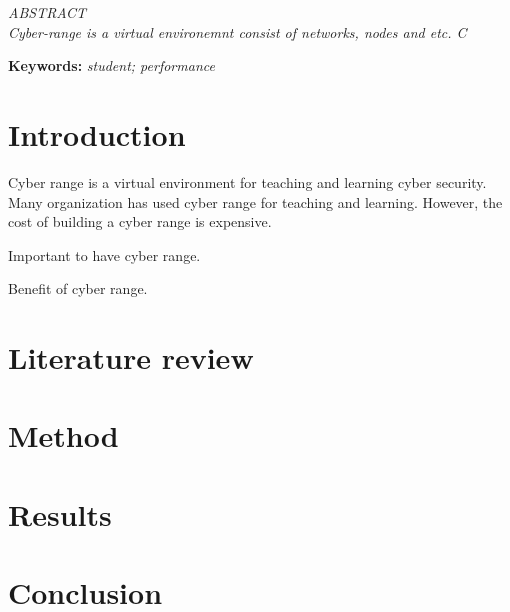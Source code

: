 \documentclass[onecolumn]{article}
\date{}
\makeatletter
\renewenvironment{abstract}
{\trivlist\item[]\leftskip1pt\par\itshape{\centering\itshape ABSTRACT\\\noindent }\ignorespaces}{\endtrivlist\vspace*{-12pt}}
\def\author#1{\gdef\@author{\hskip-\dimexpr(\tabcolsep)\hskip1pt\parbox{\dimexpr\textwidth-1pt}{\fontsize{11}{13}\selectfont\raggedright\centering #1}}}
\def\title#1{\gdef\@title{\fontsize{14}{16}\selectfont\raggedright\centering{\bfseries#1}~\\{\textit{\fontsize{12}{14}\selectfont\malaytitle}}}}
\let\@articletype\@empty
\def\articletype#1{\gdef\@articletype{{\fontsize{13}{15}\selectfont #1}}}
\makeatother
\begin{document}
\def\authorCount{1}
\def\affCount{1}

\def\journalTitle{GEMA Online{\textsuperscript{\textregistered}} Journal of Language Studies}

\title{UKM Cyber-range: Issues and Challenges}
\def\malaytitle{}
\def\articletype{}
\author{Mohd Zamri Murah}
\maketitle

\begin{abstract}
Cyber-range is a virtual environemnt consist of networks, nodes and 
etc. C

\end{abstract}

\vspace{1mm}
\smallskip\noindent\textbf{Keywords: }\textit{student; performance}
    
\section*{Introduction}

Cyber range is a virtual environment for teaching and learning cyber security. Many organization has used cyber range for teaching and learning. However, the cost of building a cyber range is expensive.

Important to have cyber range.

Benefit of cyber range.


\section{Literature review}

\section{Method}

\section{Results}

\section{Conclusion}
\end{document}
